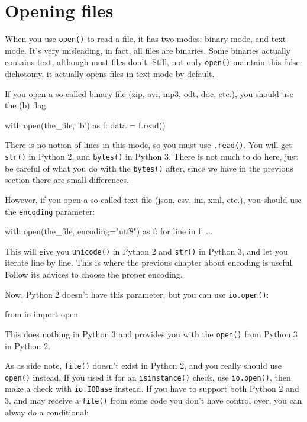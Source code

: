 \section{Opening files}

When you use \lstinline{open()} to read a file, it has two modes: binary mode, and text mode. It's very misleading, in fact, all files are binaries. Some binaries actually contains text, although most files don't. Still, not only \lstinline{open()} maintain this false dichotomy, it actually opens files in text mode by default.

If you open a so-called binary file (zip, avi, mp3, odt, doc, etc.), you should use the \textquote(b) flag:

\begin{py2and3}
with open(the_file, 'b') as f:
    data = f.read()
\end{py2and3}

There is no notion of lines in this mode, so you must use \lstinline{.read()}. You will get \lstinline{str()} in Python 2, and \lstinline{bytes()} in Python 3. There is not much to do here, just be careful of what you do with the \lstinline{bytes()} after, since we have in the previous section there are small differences.

However, if you open a so-called text file (json, csv, ini, xml, etc.), you should use the \lstinline{encoding} parameter:

\begin{py3}
with open(the_file, encoding="utf8") as f:
    for line in f:
        ...
\end{py3}

This will give you \lstinline{unicode()} in Python 2 and \lstinline{str()} in Python 3, and let you iterate line by line. This is where the previous chapter about encoding is useful. Follow its advices to choose the proper encoding.

Now, Python 2 doesn't have this parameter, but you can use \lstinline{io.open()}:

\begin{py2and3}
from io import open
\end{py2and3}

This does nothing in Python 3 and provides you with the \lstinline{open()} from Python 3 in Python 2.

As as side note, \lstinline{file()} doesn't exist in Python 2, and you really should use \lstinline{open()} instead. If you used it for an \lstinline{isinstance()} check, use \lstinline{io.open()}, then make a check with \lstinline{io.IOBase} instead. If you have to support both Python 2 and 3, and may receive a \lstinline{file()} from some code you don't have control over, you can alway do a conditional:

